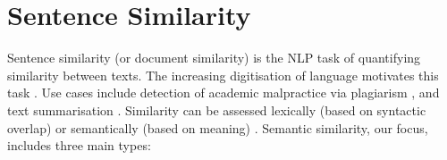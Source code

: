 \documentclass[10pt,oneside]{report}
\begin{document}
\section{Sentence Similarity}\label{sec:sentenceSimilarity}

Sentence similarity (or document similarity) is the NLP task of quantifying similarity between texts. The increasing digitisation of language motivates this task \cite{raju2022sentence}. Use cases include detection of academic malpractice via plagiarism \cite{lukashenko2007computer, baba2017plagiarism}, and text summarisation \cite {aliguliyev2009new, kumar2020semantic, jo2017k}. 
Similarity can be assessed lexically (based on syntactic overlap) or semantically (based on meaning) \cite{raju2022sentence}. Semantic similarity, our focus, includes three main types:
\end{document}
